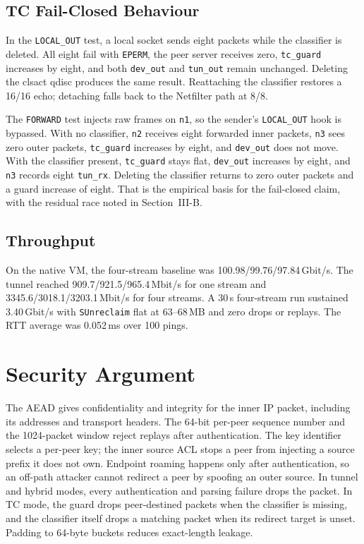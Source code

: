 \documentclass[conference]{IEEEtran}
\newcommand{\code}[1]{\texttt{#1}}
\begin{document}
\subsection{TC Fail-Closed Behaviour}
In the \code{LOCAL\_OUT} test, a local socket sends eight packets while the classifier is deleted. All eight fail with \code{EPERM}, the peer server receives zero, \code{tc\_guard} increases by eight, and both \code{dev\_out} and \code{tun\_out} remain unchanged. Deleting the clsact qdisc produces the same result. Reattaching the classifier restores a 16/16 echo; detaching falls back to the Netfilter path at 8/8.

The \code{FORWARD} test injects raw frames on \code{n1}, so the sender's \code{LOCAL\_OUT} hook is bypassed. With no classifier, \code{n2} receives eight forwarded inner packets, \code{n3} sees zero outer packets, \code{tc\_guard} increases by eight, and \code{dev\_out} does not move. With the classifier present, \code{tc\_guard} stays flat, \code{dev\_out} increases by eight, and \code{n3} records eight \code{tun\_rx}. Deleting the classifier returns to zero outer packets and a guard increase of eight. That is the empirical basis for the fail-closed claim, with the residual race noted in Section~III-B.

\subsection{Throughput}
On the native VM, the four-stream baseline was 100.98/99.76/97.84\,Gbit/s. The tunnel reached 909.7/921.5/965.4\,Mbit/s for one stream and 3345.6/3018.1/3203.1\,Mbit/s for four streams. A 30\,s four-stream run sustained 3.40\,Gbit/s with \code{SUnreclaim} flat at 63--68\,MB and zero drops or replays. The RTT average was 0.052\,ms over 100 pings.

\section{Security Argument}
The AEAD gives confidentiality and integrity for the inner IP packet, including its addresses and transport headers. The 64-bit per-peer sequence number and the 1024-packet window reject replays after authentication. The key identifier selects a per-peer key; the inner source ACL stops a peer from injecting a source prefix it does not own. Endpoint roaming happens only after authentication, so an off-path attacker cannot redirect a peer by spoofing an outer source. In tunnel and hybrid modes, every authentication and parsing failure drops the packet. In TC mode, the guard drops peer-destined packets when the classifier is missing, and the classifier itself drops a matching packet when its redirect target is unset. Padding to 64-byte buckets reduces exact-length leakage.
\end{document}
